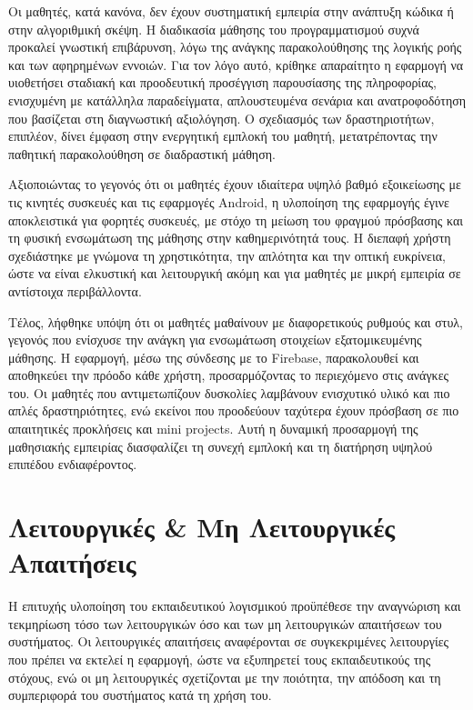 \documentclass[11pt]{report}
\begin{document}
Οι μαθητές, κατά κανόνα, δεν έχουν συστηματική εμπειρία στην ανάπτυξη κώδικα ή στην αλγοριθμική σκέψη. Η διαδικασία μάθησης του προγραμματισμού συχνά προκαλεί γνωστική επιβάρυνση, λόγω της ανάγκης παρακολούθησης της λογικής ροής και των αφηρημένων εννοιών. Για τον λόγο αυτό, κρίθηκε απαραίτητο η εφαρμογή να υιοθετήσει σταδιακή και προοδευτική προσέγγιση παρουσίασης της πληροφορίας, ενισχυμένη με κατάλληλα παραδείγματα, απλουστευμένα σενάρια και ανατροφοδότηση που βασίζεται στη διαγνωστική αξιολόγηση. Ο σχεδιασμός των δραστηριοτήτων, επιπλέον, δίνει έμφαση στην ενεργητική εμπλοκή του μαθητή, μετατρέποντας την παθητική παρακολούθηση σε διαδραστική μάθηση. 

Αξιοποιώντας το γεγονός ότι οι μαθητές έχουν ιδιαίτερα υψηλό βαθμό εξοικείωσης με τις κινητές συσκευές και τις εφαρμογές Android, η υλοποίηση της εφαρμογής έγινε αποκλειστικά για φορητές συσκευές, με στόχο τη μείωση του φραγμού πρόσβασης και τη φυσική ενσωμάτωση της μάθησης στην καθημερινότητά τους. Η διεπαφή χρήστη σχεδιάστηκε με γνώμονα τη χρηστικότητα, την απλότητα και την οπτική ευκρίνεια, ώστε να είναι ελκυστική και λειτουργική ακόμη και για μαθητές με μικρή εμπειρία σε αντίστοιχα περιβάλλοντα. 

Τέλος, λήφθηκε υπόψη ότι οι μαθητές μαθαίνουν με διαφορετικούς ρυθμούς και στυλ, γεγονός που ενίσχυσε την ανάγκη για ενσωμάτωση στοιχείων εξατομικευμένης μάθησης. Η εφαρμογή, μέσω της σύνδεσης με το Firebase, παρακολουθεί και αποθηκεύει την πρόοδο κάθε χρήστη, προσαρμόζοντας το περιεχόμενο στις ανάγκες του. Οι μαθητές που αντιμετωπίζουν δυσκολίες λαμβάνουν ενισχυτικό υλικό και πιο απλές δραστηριότητες, ενώ εκείνοι που προοδεύουν ταχύτερα έχουν πρόσβαση σε πιο απαιτητικές προκλήσεις και mini projects. Αυτή η δυναμική προσαρμογή της μαθησιακής εμπειρίας διασφαλίζει τη συνεχή εμπλοκή και τη διατήρηση υψηλού επιπέδου ενδιαφέροντος. 
\section{Λειτουργικές \& Μη Λειτουργικές Απαιτήσεις}

Η επιτυχής υλοποίηση του εκπαιδευτικού λογισμικού προϋπέθεσε την αναγνώριση και τεκμηρίωση τόσο των λειτουργικών όσο και των μη λειτουργικών απαιτήσεων του συστήματος. Οι λειτουργικές απαιτήσεις αναφέρονται σε συγκεκριμένες λειτουργίες που πρέπει να εκτελεί η εφαρμογή, ώστε να εξυπηρετεί τους εκπαιδευτικούς της στόχους, ενώ οι μη λειτουργικές σχετίζονται με την ποιότητα, την απόδοση και τη συμπεριφορά του συστήματος κατά τη χρήση του. 
\end{document}
